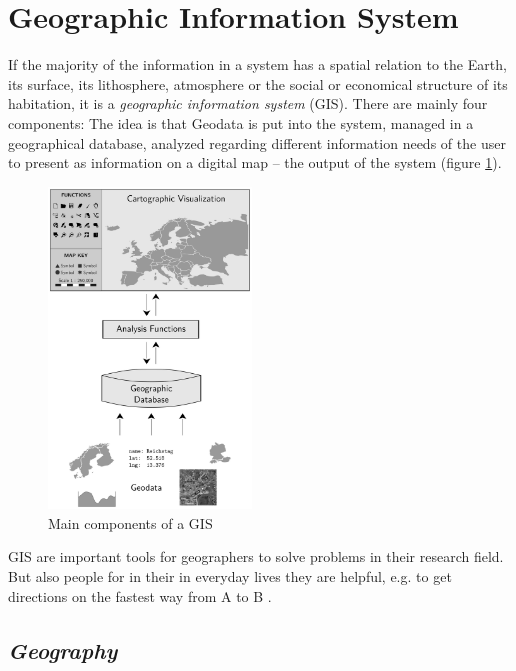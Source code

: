 


\section{Geographic Information System} %
\label{sub:geographic_information_system}

If the majority of the information in a system has a spatial relation to the Earth, its surface, its lithosphere, atmosphere or the social or economical structure of its habitation, it is a \emph{geographic information system} (GIS). There are mainly four components: The idea is that Geodata is put into the system, managed in a geographical database, analyzed regarding different information needs of the user to present as information on a digital map -- the output of the system (figure \ref{fig:gis_components}).

\begin{figure}[ht]
  \centering
  \includegraphics[width=0.48\textwidth]{graphics/basics/gis_components}
  \caption{Main components of a GIS}
  \label{fig:gis_components}
\end{figure}

GIS are important tools for geographers to solve problems in their research field. But also people for in their in everyday lives they are helpful, e.g. to get directions on the fastest way from A to B
\cite{ngGeography}.


\subsection{\emph{Geography}} %

